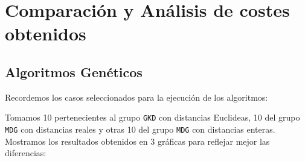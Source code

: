 \newpage






\section{Comparación y Análisis de costes obtenidos}



\subsection{Algoritmos Genéticos}

Recordemos los casos seleccionados para la ejecución de los algoritmos:

Tomamos 10 pertenecientes al grupo \texttt{GKD} con distancias Euclideas, 10 del grupo \texttt{MDG} con distancias reales y otras 10 del grupo \texttt{MDG} con distancias enteras. Mostramos los resultados obtenidos en 3 gráficas para reflejar mejor las diferencias:



